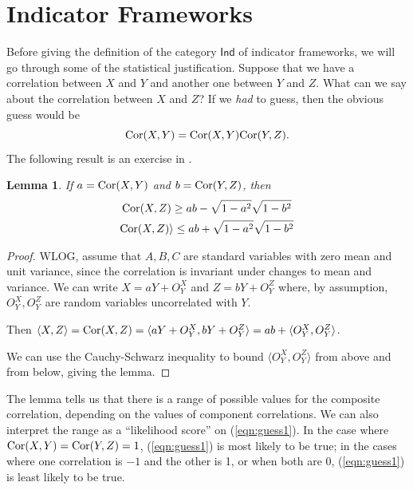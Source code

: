 \documentclass{sig-alternate-05-2015}
\theoremstyle{plain}
\newtheorem{lem}[thm]{Lemma}
\theoremstyle{plain}
\theoremstyle{remark}
\newcommand{\redout}[1]{{\color{red}#1}}
\newcommand{\Cat}[1]{\mathsf{#1}}
\def\Ind{\Cat{Ind}}
\def\Cor{\textnormal{Cor}}
\begin{document}

\section{Indicator Frameworks}
Before giving the definition of the category $\Ind$ of indicator frameworks, we will go through some of the statistical justification. Suppose that we have a correlation between $X$ and $Y$ and another one between $Y$ and $Z$. What can we say about the correlation between $X$ and $Z$? If we \emph{had} to guess, then the obvious guess would be 
\begin{equation}\label{eqn:guess1}\Cor(X,Y) = \Cor(X,Y)\Cor(Y,Z).\end{equation}
The following result is an exercise in \cite{?}.

\begin{lem}If $a = \Cor(X,Y)$ and $b = \Cor(Y,Z)$, then 
\begin{gather}
\Cor(X,Z) \geq ab - \sqrt{1-a^2}\sqrt{1-b^2} \\ 
\Cor(X,Z) \rangle \leq ab + \sqrt{1-a^2}\sqrt{1-b^2}
\end{gather}
\end{lem}

\begin{proof}
WLOG, assume that $A,B,C$ are standard variables with zero mean and unit variance, since the correlation is invariant under changes to mean and variance. We can write $X = a Y + O_Y^X$ and $Z = b Y + O_Y^Z$ where, by assumption, $O_Y^X, O_Y^Z$ are random variables uncorrelated with $Y$.

Then $\langle X, Z \rangle = \Cor(X,Z) = \langle aY + O_Y^X, bY + O_Y^Z \rangle = ab + \langle O_Y^X, O_Y^Z \rangle$.

We can use the Cauchy-Schwarz inequality to bound $\langle O_Y^X, O_Y^Z \rangle$ from above and from below, giving the lemma.
\end{proof}

The lemma tells us that there is a range of possible values for the composite correlation, depending on the values of component correlations. We can also interpret the range as a ``likelihood score'' on (\ref{eqn:guess1}). In the case where $\Cor(X,Y) = \Cor(Y,Z) = 1$, (\ref{eqn:guess1}) is most likely to be true; in the cases where one correlation is $-1$ and the other is 1, or when both are 0, (\ref{eqn:guess1}) is least likely to be true.
\end{document}
